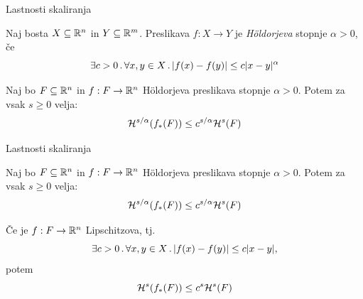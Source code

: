 \documentclass[10pt]{beamer}
\begin{document}

\begin{frame}[t]{Lastnosti skaliranja}
    \begin{definicija} Naj bosta \(X \subseteq \mathbb{R}^n\) in \(Y \subseteq \mathbb{R}^m\).
        Preslikava \(f: X \to Y\) je \emph{Höldorjeva} stopnje \(\alpha > 0\), če
        \[\exists c > 0 \,.\, \forall x, y \in X \,.\, |f(x) -f(y)| \leq c|x-y|^\alpha\]             
    \end{definicija}  
    \pause
    \begin{trditev}
        Naj bo \(F \subseteq \mathbb{R}^n\) in \(f: F \to \mathbb{R}^n\) Höldorjeva preslikava stopnje \(\alpha > 0\). Potem za vsak \(s \geq 0\) velja:
        \[\mathcal{H}^{s/\alpha}(f_{*}(F)) \leq c^{s/\alpha} \mathcal{H}^s(F)\]
    \end{trditev}
\end{frame}

\begin{frame}[t]{Lastnosti skaliranja}
    \begin{trditev}
        Naj bo \(F \subseteq \mathbb{R}^n\) in \(f: F \to \mathbb{R}^n\) Höldorjeva preslikava stopnje \(\alpha > 0\). Potem za vsak \(s \geq 0\) velja:
        \[\mathcal{H}^{s/\alpha}(f_{*}(F)) \leq c^{s/\alpha} \mathcal{H}^s(F)\]
    \end{trditev}

    \begin{posledica}
        Če je \(f: F \to \mathbb{R}^n\) Lipschitzova, tj.
        \[\exists c > 0 \,.\, \forall x, y \in X \,.\, |f(x) -f(y)| \leq c|x-y|,\]
        potem
        \[\mathcal{H}^{s}(f_{*}(F)) \leq c^{s} \mathcal{H}^s(F)\]
    \end{posledica}
\end{frame}
\end{document}
